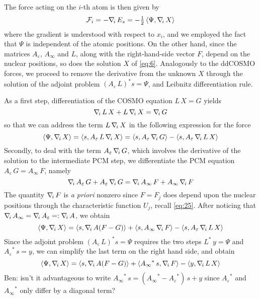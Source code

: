 The force acting on the $i$-th atom is then given by
\[
\mathcal{F}_i = -\nabla_{\!i}\, E_s = - \tfrac{1}{2} 
\,  \langle \Psi, \nabla_{\!i}\, X \rangle 
\]
where the gradient is understood with respect to $x_i$, and we employed the fact that $\Psi$ is independent of the atomic positions. On the other hand, since the matrices $A_\varepsilon$, $A_\infty$ and $L$, along with the right-hand-side vector $F$, depend on the nuclear positions, so does the solution $X$ of \eqref{eq:6}. Analogously to the ddCOSMO forces, we proceed to remove the derivative from the unknown $X$ through the solution of the adjoint problem $(A_\varepsilon \, L)^* s = \Psi$, and Leibnitz differentiation rule.

As a first step, differentiation of the COSMO equation $L\, X = G$ yields
\[
\nabla_{\!i}\, L \, X + L \, \nabla_{\!i}\, X = \nabla_{\!i}\, G
\]
so that we can address the term $L \, \nabla_{\!i}\, X$ in the following expression for the force
\[
\langle \Psi , \nabla_{\!i}\, X\rangle  = \langle s ,  A_\varepsilon \, L \, \nabla_{\!i}\, X\rangle
 = \langle s ,  A_\varepsilon \, \nabla_{\!i}\, G \rangle - \langle s , A_\varepsilon \, \nabla_{\!i}\, L \,  X \rangle
\]
Secondly, to deal with the term $A_\varepsilon \, \nabla_{\!i}\, G$, which involves the derivative of the solution to the intermediate PCM step, we differentiate the PCM equation $A_\varepsilon \, G = A_\infty \, F$, namely
\[
\nabla_{\!i}\, A_\varepsilon \, G + A_\varepsilon \, \nabla_{\!i}\, G = \nabla_{\!i}\, A_\infty \, F + A_\infty \, \nabla_{\!i}\, F
\]
The quantity $\nabla_{\!i}\, F$ is \emph{a priori} nonzero since $F = F_j$ does depend upon the nuclear positions through the characteristic function $U_j$, recall \eqref{eq:25}. After noticing that $\nabla_{\!i}\, A_\infty=\nabla_{\!i}\, A_\varepsilon =: \nabla_{\!i}\, A$, we obtain
\[
\langle \Psi , \nabla_{\!i}\, X\rangle = \langle s , \nabla_{\!i}\,  A ( F - G ) \rangle + \langle  s ,{A_\infty}\, \nabla_{\!i}\, F \rangle - \langle  s , {A_\varepsilon}\, \nabla_{\!i}\, L \,  X \rangle
\]
Since the adjoint problem $(A_\varepsilon \, L )^* s = \Psi$ requires the two steps ${L}^* \, y = \Psi$ and ${A_\varepsilon}^* \, s = y$, we can simplify the last term on the right hand side, and obtain
\[
\langle \Psi , \nabla_{\!i}\, X\rangle = \langle s , \nabla_{\!i}\,  A ( F - G ) \rangle + \langle {A_\infty}^*\, s , \nabla_{\!i}\, F \rangle - \langle  y , \nabla_{\!i}\, L \,  X \rangle
\]
\color{red}
Ben: isn't it advantageous to write ${A_\infty}^*\, s = ({A_\infty}^*-{A_\varepsilon}^*)\, s + y$ since ${A_\varepsilon}^*$ and ${A_\infty}^*$ only differ by a diagonal term?
\color{black}

